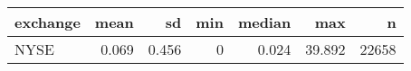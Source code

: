 
\begin{tabular}{lrrrrrr}
\toprule
exchange & mean & sd & min & median & max & n\\
\midrule
NYSE & 0.069 & 0.456 & 0 & 0.024 & 39.892 & 22658\\
\bottomrule
\end{tabular}
